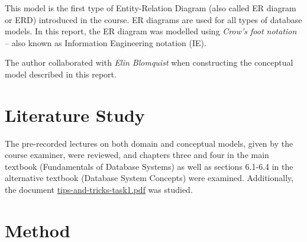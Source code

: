 \documentclass[a4paper]{scrartcl}
\begin{document}
This model is the first type of Entity-Relation Diagram (also called ER diagram or
ERD) introduced in the course. 
ER diagrams are used for all types of database
models.  
In this report, the ER diagram was modelled using \emph{Crow's foot notation}
-- also known as Information Engineering notation (IE).

The author collaborated with
\emph{Elin Blomquist}
when constructing the conceptual model described in this report.



\section{Literature Study}

The pre-recorded lectures on both domain and conceptual models, given by the
course examiner, were reviewed, and chapters three and four in the main textbook
(Fundamentals of Database Systems) as well as sections 6.1-6.4 in the
alternative textbook (Database System Concepts) were examined. 
Additionally, the document 
\href{https://canvas.kth.se/courses/43013/files/7095362?wrap=1}{tips-and-tricks-task1.pdf}
was studied.

\clearpage
\section{Method}
\label{sec:method}

\end{document}
